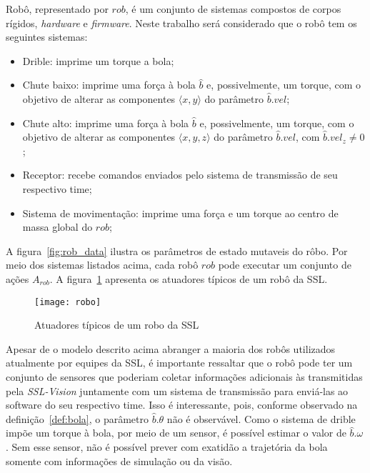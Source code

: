 
\begin{defi}[Robô]
  Robô, representado por $rob$, é um conjunto de sistemas compostos
  de corpos rígidos, \textit{hardware} e \textit{firmware}. Neste
  trabalho será considerado que o robô tem os seguintes sistemas:

  \begin{itemize}
    \item Drible: imprime um torque a bola;
    \item Chute baixo: imprime uma força à bola $\hat{b}$
          e, possivelmente, um torque, com o objetivo de
          alterar as componentes $\langle x,y \rangle$
          do parâmetro $\hat{b}.vel$;
    \item Chute alto: imprime uma força à bola $\hat{b}$
          e, possivelmente, um torque, com o objetivo de
          alterar as componentes $\langle x,y,z \rangle$
          do parâmetro $\hat{b}.vel$, com $\hat{b}.vel_z \neq 0$;
    \item Receptor: recebe comandos enviados pelo sistema de
          transmissão de seu respectivo time;
    \item Sistema de movimentação: imprime uma força e um torque
          ao centro de massa global do $rob$;
  \end{itemize}
\end{defi}

  A figura~\ref{fig:rob_data} ilustra os parâmetros de estado mutaveis
  do rôbo. Por meio dos sistemas listados acima, cada robô $rob$ pode
  executar um conjunto de ações $A_{rob}$. A figura~\ref{fig:robo}
  apresenta os atuadores típicos de um robô da SSL.

  \begin{figure}[H]
    \centering
    \texttt{[image: robo]}
    \caption{Atuadores típicos de um robo da SSL}\label{fig:robo}
  \end{figure}

  Apesar de o modelo descrito acima abranger a maioria dos
  robôs utilizados atualmente por equipes da SSL, é importante
  ressaltar que o robô pode ter um conjunto de sensores que
  poderiam coletar informações adicionais às transmitidas pela
  \textit{SSL-Vision} juntamente com um sistema de transmissão
  para enviá-las ao software do seu respectivo time. Isso é
  interessante, pois, conforme observado na definição~\ref{def:bola},
  o parâmetro $\hat{b}.\theta$ não é observável. Como o sistema de
  drible impõe um torque à bola, por meio de um sensor, é possível
  estimar o valor de $\hat{b}.\omega$. Sem esse sensor, não é possível
  prever com exatidão a trajetória da bola somente com informações de
  simulação ou da visão.


